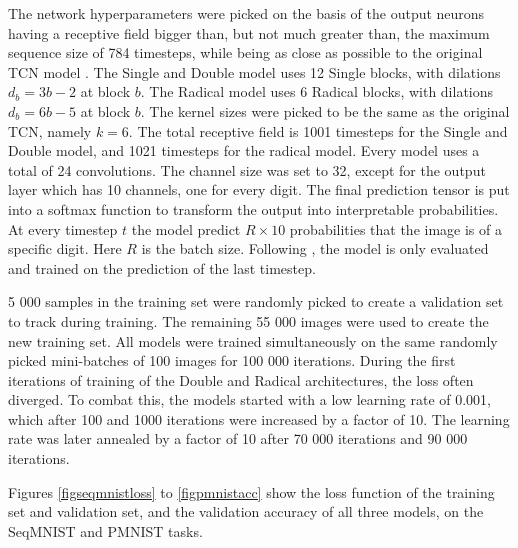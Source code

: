\documentclass[a4paper, twoside]{article}
\begin{document}
The network hyperparameters were picked on the basis of the output neurons having a receptive field bigger than, but not much greater than, the maximum sequence size of 784 timesteps, while being as close as possible to the original TCN model \cite{tcn}. The Single and Double model uses 12 Single blocks, with dilations $d_b=3b-2$ at block $b$. The Radical model uses 6 Radical blocks, with dilations $d_b=6b-5$ at block $b$. The kernel sizes were picked to be the same as the original TCN, namely $k=6$. The total receptive field is 1001 timesteps for the Single and Double model, and 1021 timesteps for the radical model. Every model uses a total of 24 convolutions. The channel size was set to 32, except for the output layer which has 10 channels, one for every digit. The final prediction tensor is put into a softmax function to transform the output into interpretable probabilities. At every timestep $t$ the model predict $R \times 10$ probabilities that the image is of a specific digit. Here $R$ is the batch size. Following \cite{tcn}, the model is only evaluated and trained on the prediction of the last timestep.

5 000 samples in the training set were randomly picked to create a validation set to track during training. The remaining 55 000 images were used to create the new training set. All models were trained simultaneously on the same randomly picked mini-batches of 100 images for 100 000 iterations. During the first iterations of training of the Double and Radical architectures, the loss often diverged. To combat this, the models started with a low learning rate of 0.001, which after 100 and 1000 iterations were increased by a factor of 10. The learning rate was later annealed by a factor of 10 after 70 000 iterations and 90 000 iterations.

Figures \ref{figseqmnistloss} to \ref{figpmnistacc} show the loss function of the training set and validation set, and the validation accuracy of all three models, on the SeqMNIST and PMNIST tasks.
\end{document}
